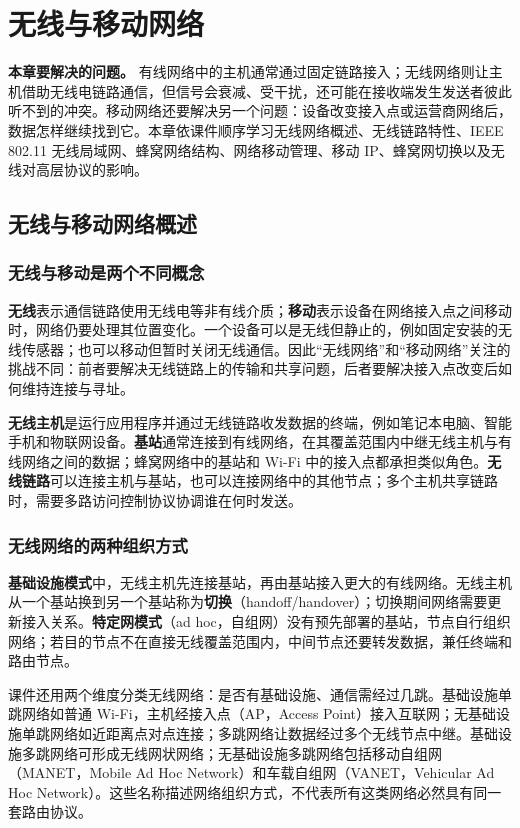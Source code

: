 \chapter{无线与移动网络}

\noindent\textbf{本章要解决的问题。} 有线网络中的主机通常通过固定链路接入；无线网络则让主机借助无线电链路通信，但信号会衰减、受干扰，还可能在接收端发生发送者彼此听不到的冲突。移动网络还要解决另一个问题：设备改变接入点或运营商网络后，数据怎样继续找到它。本章依课件顺序学习无线网络概述、无线链路特性、IEEE 802.11 无线局域网、蜂窝网络结构、网络移动管理、移动 IP、蜂窝网切换以及无线对高层协议的影响。

\section{无线与移动网络概述}
\subsection{无线与移动是两个不同概念}
\textbf{无线}表示通信链路使用无线电等非有线介质；\textbf{移动}表示设备在网络接入点之间移动时，网络仍要处理其位置变化。一个设备可以是无线但静止的，例如固定安装的无线传感器；也可以移动但暂时关闭无线通信。因此“无线网络”和“移动网络”关注的挑战不同：前者要解决无线链路上的传输和共享问题，后者要解决接入点改变后如何维持连接与寻址。

\textbf{无线主机}是运行应用程序并通过无线链路收发数据的终端，例如笔记本电脑、智能手机和物联网设备。\textbf{基站}通常连接到有线网络，在其覆盖范围内中继无线主机与有线网络之间的数据；蜂窝网络中的基站和 Wi-Fi 中的接入点都承担类似角色。\textbf{无线链路}可以连接主机与基站，也可以连接网络中的其他节点；多个主机共享链路时，需要多路访问控制协议协调谁在何时发送。

\subsection{无线网络的两种组织方式}
\textbf{基础设施模式}中，无线主机先连接基站，再由基站接入更大的有线网络。无线主机从一个基站换到另一个基站称为\textbf{切换}（handoff/handover）；切换期间网络需要更新接入关系。\textbf{特定网模式}（ad hoc，自组网）没有预先部署的基站，节点自行组织网络；若目的节点不在直接无线覆盖范围内，中间节点还要转发数据，兼任终端和路由节点。

课件还用两个维度分类无线网络：是否有基础设施、通信需经过几跳。基础设施单跳网络如普通 Wi-Fi，主机经接入点（AP，Access Point）接入互联网；无基础设施单跳网络如近距离点对点连接；多跳网络让数据经过多个无线节点中继。基础设施多跳网络可形成无线网状网络；无基础设施多跳网络包括移动自组网（MANET，Mobile Ad Hoc Network）和车载自组网（VANET，Vehicular Ad Hoc Network）。这些名称描述网络组织方式，不代表所有这类网络必然具有同一套路由协议。

